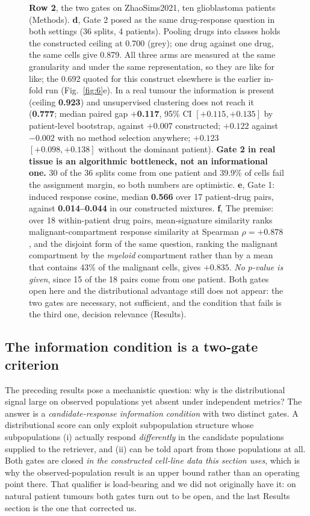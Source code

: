 \documentclass[11pt,letterpaper]{article}
\newcommand{\PREMISEOVERLAP}{+0.878}
\newcommand{\PREMISEDISJOINT}{+0.835}
\begin{document}
\begin{figure}[!htbp]
{\textbf{Row 2}, the two gates on ZhaoSims2021, ten glioblastoma patients (Methods). \textbf{d}, Gate 2 posed as the same drug-response question in both settings (36 splits, 4 patients). Pooling drugs into classes holds the constructed ceiling at 0.700 (grey); one drug against one drug, the same cells give 0.879. All three arms are measured at the same granularity and under the same representation, so they are like for like; the 0.692 quoted for this construct elsewhere is the earlier in-fold run (Fig.~\ref{fig:6}e). In a real tumour the information is present (ceiling \textbf{0.923}) and unsupervised clustering does not reach it (\textbf{0.777}; median paired gap \textbf{$+$0.117}, 95\% CI $[+0.115, +0.135]$ by patient-level bootstrap, against $+0.007$ constructed; $+0.122$ against $-0.002$ with no method selection anywhere; $+0.123$ $[+0.098, +0.138]$ without the dominant patient). \textbf{Gate 2 in real tissue is an algorithmic bottleneck, not an informational one.} 30 of the 36 splits come from one patient and 39.9\% of cells fail the assignment margin, so both numbers are optimistic. \textbf{e}, Gate 1: induced response cosine, median \textbf{0.566} over 17 patient-drug pairs, against \textbf{0.014--0.044} in our constructed mixtures. \textbf{f}, The premise: over 18 within-patient drug pairs, mean-signature similarity ranks malignant-compartment response similarity at Spearman $\rho = \mathbf{\PREMISEOVERLAP}$, and the disjoint form of the same question, ranking the malignant compartment by the \emph{myeloid} compartment rather than by a mean that contains 43\% of the malignant cells, gives $\mathbf{\PREMISEDISJOINT}$. \emph{No $p$-value is given}, since 15 of the 18 pairs come from one patient. Both gates open here and the distributional advantage still does not appear: the two gates are necessary, not sufficient, and the condition that fails is the third one, decision relevance (Results).}
\label{fig:5}
\end{figure}

\subsection*{The information condition is a two-gate criterion}

The preceding results pose a mechanistic question: why is the distributional signal large
on observed populations yet absent under independent metrics? The answer is a
\textit{candidate-response information condition} with two distinct gates. A
distributional score can only exploit subpopulation structure whose subpopulations (i) actually
respond \emph{differently} in the candidate populations supplied to the retriever, and (ii) can
be told apart from those populations at all. Both gates are closed \emph{in the constructed
cell-line data this section uses}, which is why the observed-population result is an upper bound
rather than an operating point there. That qualifier is load-bearing and we did not originally
have it: on natural patient tumours both gates turn out to be open, and the last Results section
is the one that corrected us.
\end{document}
